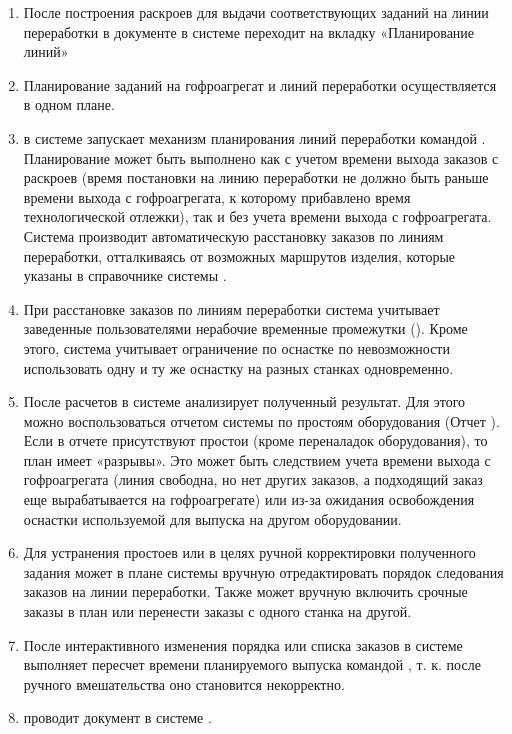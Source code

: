 \begin{enumerate}

\item	После построения раскроев для выдачи соответствующих заданий на линии переработки \planner в документе  в системе \gofro переходит на вкладку «Планирование линий»
\item	Планирование заданий на гофроагрегат и линий переработки осуществляется в одном плане.
\item	\planner в системе \gofro запускает механизм планирования линий переработки командой . Планирование может быть выполнено как с учетом времени выхода заказов с раскроев (время постановки на линию переработки не должно быть раньше времени выхода с гофроагрегата, к которому прибавлено время технологической отлежки), так и без учета времени выхода с гофроагрегата. Система \gofro производит автоматическую расстановку заказов по линиям переработки, отталкиваясь от возможных маршрутов изделия, которые указаны в справочнике   системы \gofro.
\item	При расстановке заказов по линиям переработки система \gofro учитывает заведенные пользователями нерабочие временные промежутки (). Кроме этого, система учитывает ограничение по оснастке по невозможности использовать одну и ту же оснастку на разных станках одновременно.
\item	После расчетов \planner в системе \gofro анализирует полученный результат. Для этого можно воспользоваться отчетом системы \gofro по простоям оборудования (Отчет ). Если в отчете присутствуют простои (кроме переналадок оборудования), то план имеет «разрывы». Это может быть следствием учета времени  выхода с гофроагрегата (линия свободна, но нет других заказов, а подходящий заказ еще вырабатывается на гофроагрегате) или из-за ожидания освобождения оснастки используемой для выпуска на другом оборудовании. 
\item	Для устранения простоев или в целях ручной корректировки полученного задания \planner может в плане системы \gofro вручную отредактировать порядок следования заказов на линии переработки. Также \planner может вручную включить срочные заказы в план или перенести заказы с одного станка на другой.
\item	После интерактивного изменения порядка или списка заказов \planner в системе \gofro выполняет пересчет времени планируемого выпуска командой , т. к. после ручного вмешательства оно становится некорректно.

\item	\planner проводит документ   в системе \gofro.
\end{enumerate}




